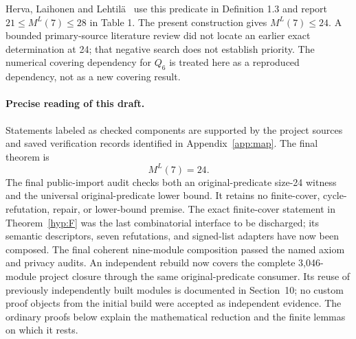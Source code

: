 \documentclass[11pt]{article}
\theoremstyle{definition}\newtheorem{definition}[theorem]{Definition}
\theoremstyle{remark}\newtheorem{remark}[theorem]{Remark}
\newcommand{\Q}{Q}
\begin{document}
Herva, Laihonen and Lehtil\"a~\cite{herva2024} use this predicate in Definition 1.3 and report $21\le M^L(7)\le28$ in Table 1. The present construction gives $M^L(7)\le24$. A bounded primary-source literature review did not locate an earlier exact determination at 24; that negative search does not establish priority. The numerical covering dependency for $\Q_6$ is treated here as a reproduced dependency, not as a new covering result.

\paragraph{Precise reading of this draft.}
Statements labeled as checked components are supported by the project sources and saved verification records identified in Appendix~\ref{app:map}. The final theorem is
\[
 M^L(7)=24.
\]
The final public-import audit checks both an original-predicate size-24 witness and the universal original-predicate lower bound. It retains no finite-cover, cycle-refutation, repair, or lower-bound premise. The exact finite-cover statement in Theorem~\ref{hyp:F} was the last combinatorial interface to be discharged; its semantic descriptors, seven refutations, and signed-list adapters have now been composed. The final coherent nine-module composition passed the named axiom and privacy audits. An independent rebuild now covers the complete 3,046-module project closure through the same original-predicate consumer. Its reuse of previously independently built modules is documented in Section~10; no custom proof objects from the initial build were accepted as independent evidence. The ordinary proofs below explain the mathematical reduction and the finite lemmas on which it rests.
\end{document}
